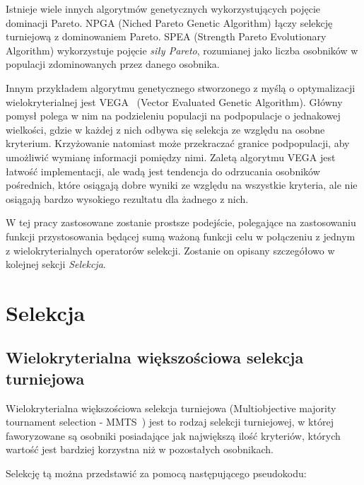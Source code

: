 \documentclass{xmgr}
\begin{document}
Istnieje wiele innych algorytmów genetycznych wykorzystujących pojęcie dominacji Pareto. NPGA (Niched Pareto Genetic Algorithm) łączy selekcję turniejową z dominowaniem Pareto. SPEA (Strength Pareto Evolutionary Algorithm) wykorzystuje pojęcie \emph{siły Pareto}, rozumianej jako liczba osobników w populacji zdominowanych przez danego osobnika.

Innym przykładem algorytmu genetycznego stworzonego z myślą o optymalizacji wielokryterialnej jest VEGA~\cite{Shaffer1984} (Vector Evaluated Genetic Algorithm). Główny pomysł polega w nim na podzieleniu populacji na podpopulacje o jednakowej wielkości, gdzie w każdej z nich odbywa się selekcja ze względu na osobne kryterium. Krzyżowanie natomiast może przekraczać granice podpopulacji, aby umożliwić wymianę informacji pomiędzy nimi. Zaletą algorytmu VEGA jest łatwość implementacji, ale wadą jest tendencja do odrzucania osobników pośrednich, które osiągają dobre wyniki ze względu na wszystkie kryteria, ale nie osiągają bardzo wysokiego rezultatu dla żadnego z nich.

W tej pracy zastosowane zostanie prostsze podejście, polegające na zastosowaniu funkcji przystosowania będącej sumą ważoną funkcji celu w połączeniu z jednym z wielokryterialnych operatorów selekcji. Zostanie on opisany szczegółowo w kolejnej sekcji \emph{Selekcja}.


\section{Selekcja}

\subsection{Wielokryterialna większościowa selekcja turniejowa}

Wielokryterialna większościowa selekcja turniejowa (Multiobjective majority tournament selection - MMTS~\cite{Luke2009Metaheuristics}) jest to rodzaj selekcji turniejowej, w której faworyzowane są osobniki posiadające jak największą ilość kryteriów, których wartość jest bardziej korzystna niż w pozostałych osobnikach.

Selekcję tą można przedstawić za pomocą następującego pseudokodu:
\end{document}
